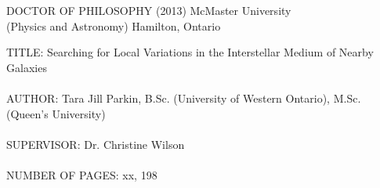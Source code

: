 

\pagestyle{empty}
\vspace*{0.5in}

\noindent 
DOCTOR OF PHILOSOPHY (2013) \hspace{2.0cm} McMaster University \\
(Physics and Astronomy)     \hspace{4.2cm} Hamilton, Ontario 
\vspace{0.5in}

\noindent
TITLE: Searching for Local Variations in the Interstellar Medium of Nearby Galaxies \\ \\
AUTHOR: Tara Jill Parkin, B.Sc. (University of Western Ontario), M.Sc. (Queen's University)\\ \\
SUPERVISOR: Dr. Christine Wilson \\ \\
NUMBER OF PAGES: xx, 198  %


